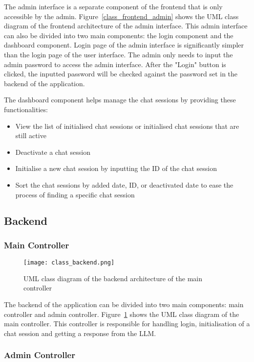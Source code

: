 The admin interface is a separate component of the frontend that is only accessible by the admin.
Figure~\ref{class_frontend_admin} shows the UML class diagram of the frontend architecture of the admin interface.
This admin interface can also be divided into two main components: the login component and the dashboard component.
Login page of the admin interface is significantly simpler than the login page of the user interface.
The admin only needs to input the admin password to access the admin interface.
After the "Login" button is clicked, the inputted password will be checked against the password set in the backend of the application.

The dashboard component helps manage the chat sessions by providing these functionalities:
\begin{itemize}
    \item View the list of initialised chat sessions or initialised chat sessions that are still active
    \item Deactivate a chat session
    \item Initialise a new chat session by inputting the ID of the chat session
    \item Sort the chat sessions by added date, ID, or deactivated date to ease the process of finding a specific chat session
\end{itemize}

\subsection{Backend}

\subsubsection{Main Controller}

\begin{figure}[h!]
    \centering
    \texttt{[image: class\_backend.png]}
    \caption{UML class diagram of the backend architecture of the main controller}
    \label{class_backend}
\end{figure}

The backend of the application can be divided into two main components: main controller and admin controller.
Figure~\ref{class_backend} shows the UML class diagram of the main controller.
This controller is responsible for handling login, initialisation of a chat session and getting a response from the \ac{LLM}.

\subsubsection{Admin Controller}

